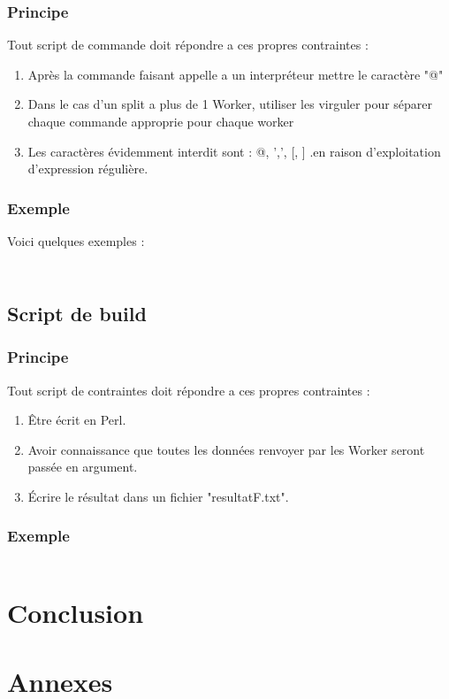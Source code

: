 \documentclass[11pt]{report}
\begin{document}
\subsection{Principe}
Tout script de commande doit répondre a ces propres contraintes :
\begin{enumerate}
\item Après la commande faisant appelle a un interpréteur mettre le caractère "@"
\item Dans le cas d'un split a plus de 1 Worker, utiliser les virguler pour séparer chaque commande approprie pour chaque worker
\item Les caractères évidemment interdit sont : @, ',', [, ] .en raison d'exploitation d'expression régulière.
\end{enumerate}
\subsection{Exemple}
Voici quelques exemples :
\inputminted{perl}{../Echantillon_Script_Cmd/nQuenn14.dc}
\inputminted{perl}{../Echantillon_Script_Cmd/Toto.dc}
\section{Script de build}
\subsection{Principe}
Tout script de contraintes doit répondre a ces propres contraintes :
\begin{enumerate}
\item Être écrit en Perl.
\item Avoir connaissance que toutes les données renvoyer par les Worker seront passée en argument.
\item Écrire le résultat dans un fichier "resultatF.txt".
\end{enumerate}
\subsection{Exemple}
\inputminted{perl}{../Echantillon_Script_build/build.pl}
\chapter{Conclusion}


\chapter{Annexes}
\end{document}
